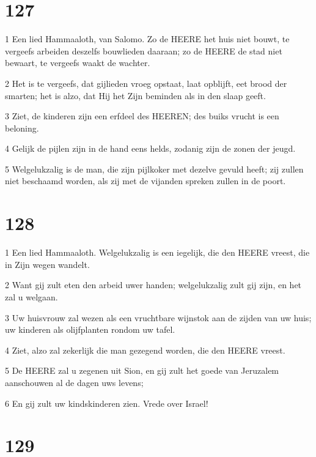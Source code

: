 \chapter{127}

\par 1 Een lied Hammaaloth, van Salomo. Zo de HEERE het huis niet bouwt, te vergeefs arbeiden deszelfs bouwlieden daaraan; zo de HEERE de stad niet bewaart, te vergeefs waakt de wachter.
\par 2 Het is te vergeefs, dat gijlieden vroeg opstaat, laat opblijft, eet brood der smarten; het is alzo, dat Hij het Zijn beminden als in den slaap geeft.
\par 3 Ziet, de kinderen zijn een erfdeel des HEEREN; des buiks vrucht is een beloning.
\par 4 Gelijk de pijlen zijn in de hand eens helds, zodanig zijn de zonen der jeugd.
\par 5 Welgelukzalig is de man, die zijn pijlkoker met dezelve gevuld heeft; zij zullen niet beschaamd worden, als zij met de vijanden spreken zullen in de poort.

\chapter{128}

\par 1 Een lied Hammaaloth. Welgelukzalig is een iegelijk, die den HEERE vreest, die in Zijn wegen wandelt.
\par 2 Want gij zult eten den arbeid uwer handen; welgelukzalig zult gij zijn, en het zal u welgaan.
\par 3 Uw huisvrouw zal wezen als een vruchtbare wijnstok aan de zijden van uw huis; uw kinderen als olijfplanten rondom uw tafel.
\par 4 Ziet, alzo zal zekerlijk die man gezegend worden, die den HEERE vreest.
\par 5 De HEERE zal u zegenen uit Sion, en gij zult het goede van Jeruzalem aanschouwen al de dagen uws levens;
\par 6 En gij zult uw kindskinderen zien. Vrede over Israel!

\chapter{129}

